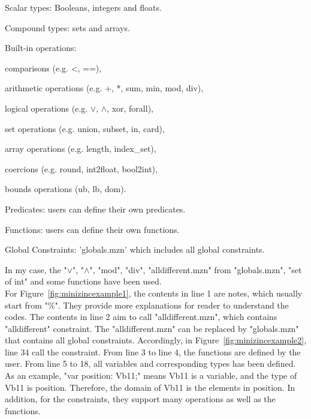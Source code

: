 \begin{compactenum}
  \item Scalar types: Booleans, integers and floats.
  \item Compound types: sets and arrays.
  \item Built-in operations: 
  \begin{compactitem}
  \item comparisons (e.g. <, ==),
  \item arithmetic operations (e.g. +, *, sum, min, mod, div),
  \item logical operations (e.g. $\vee$, $\wedge$, xor, forall),
  \item set operations (e.g. union, subset, in, card),
  \item array operations (e.g. length, index\_set),
  \item coercions (e.g. round, int2float, bool2int), 
  \item bounds operations (ub, lb, dom).
  \end{compactitem}
  \item Predicates: users can define their own predicates.
  \item Functions: users can define their own functions.
  \item Global Constraints: 'globals.mzn' which includes all global constraints.
\end{compactenum}
In my case, the "$\vee$", "$\wedge$", "mod", "div", "alldifferent.mzn" from "globals.mzn", "set of int" and some functions have been used.\\
For Figure~\ref{fig:minizincexample1}, the contents in line 1 are notes, which usually start from "\%". They provide more explanations for reader to understand the codes. The contents in line 2 aim to call "alldifferent.mzn", which contains "alldifferent" constraint. The "alldifferent.mzn" can be replaced by "globals.mzn" that contains all global constraints. Accordingly, in Figure~\ref{fig:minizincexample2}, line 34 call the constraint. From line 3 to line 4, the functions are defined by the user. From line 5 to 18, all variables and corresponding types has been defined. As an example, "var position: Vb11;" means Vb11 is a variable, and the type of Vb11 is position. Therefore, the domain of Vb11 is the elements in position. In addition, for the constraints, they support many operations as well as the functions. 
